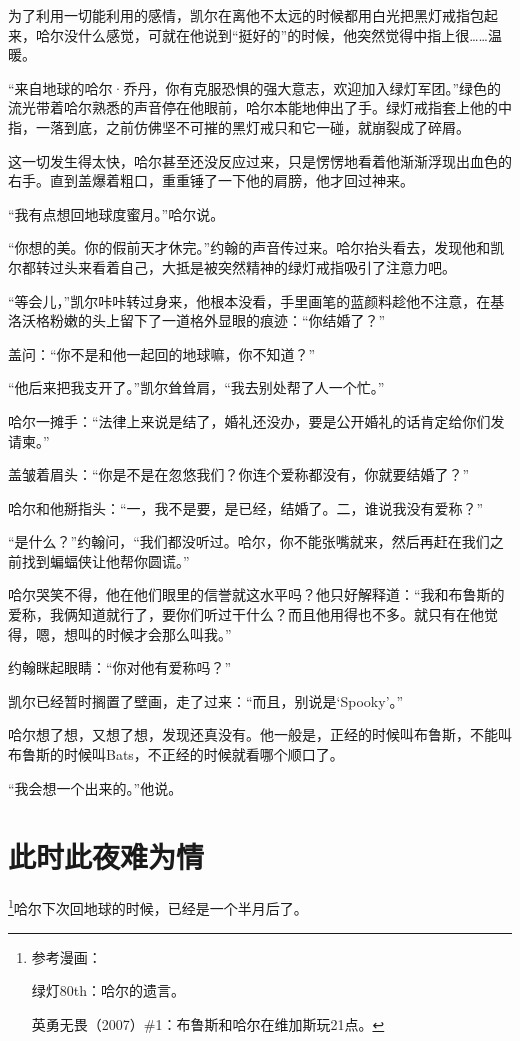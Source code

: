 \documentclass[../main]{subfiles}
\begin{document}
为了利用一切能利用的感情，凯尔在离他不太远的时候都用白光把黑灯戒指包起来，哈尔没什么感觉，可就在他说到“挺好的”的时候，他突然觉得中指上很……温暖。

“来自地球的哈尔·乔丹，你有克服恐惧的强大意志，欢迎加入绿灯军团。”绿色的流光带着哈尔熟悉的声音停在他眼前，哈尔本能地伸出了手。绿灯戒指套上他的中指，一落到底，之前仿佛坚不可摧的黑灯戒只和它一碰，就崩裂成了碎屑。

这一切发生得太快，哈尔甚至还没反应过来，只是愣愣地看着他渐渐浮现出血色的右手。直到盖爆着粗口，重重锤了一下他的肩膀，他才回过神来。

“我有点想回地球度蜜月。”哈尔说。

“你想的美。你的假前天才休完。”约翰的声音传过来。哈尔抬头看去，发现他和凯尔都转过头来看着自己，大抵是被突然精神的绿灯戒指吸引了注意力吧。

“等会儿，”凯尔咔咔转过身来，他根本没看，手里画笔的蓝颜料趁他不注意，在基洛沃格粉嫩的头上留下了一道格外显眼的痕迹：“你结婚了？”

盖问：“你不是和他一起回的地球嘛，你不知道？”

“他后来把我支开了。”凯尔耸耸肩，“我去别处帮了人一个忙。”

哈尔一摊手：“法律上来说是结了，婚礼还没办，要是公开婚礼的话肯定给你们发请柬。”

盖皱着眉头：“你是不是在忽悠我们？你连个爱称都没有，你就要结婚了？”

哈尔和他掰指头：“一，我不是要，是已经，结婚了。二，谁说我没有爱称？”

“是什么？”约翰问，“我们都没听过。哈尔，你不能张嘴就来，然后再赶在我们之前找到蝙蝠侠让他帮你圆谎。”

哈尔哭笑不得，他在他们眼里的信誉就这水平吗？他只好解释道：“我和布鲁斯的爱称，我俩知道就行了，要你们听过干什么？而且他用得也不多。就只有在他觉得，嗯，想叫的时候才会那么叫我。”

约翰眯起眼睛：“你对他有爱称吗？”

凯尔已经暂时搁置了壁画，走了过来：“而且，别说是‘Spooky’。”

哈尔想了想，又想了想，发现还真没有。他一般是，正经的时候叫布鲁斯，不能叫布鲁斯的时候叫Bats，不正经的时候就看哪个顺口了。

“我会想一个出来的。”他说。

\section{此时此夜难为情}

\footnote[1]{参考漫画：

    绿灯80th：哈尔的遗言。

    英勇无畏（2007）\#1：布鲁斯和哈尔在维加斯玩21点。}哈尔下次回地球的时候，已经是一个半月后了。
\end{document}

